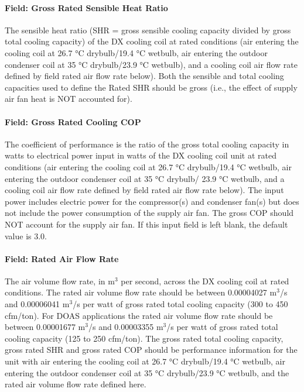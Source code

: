 \paragraph{Field: Gross Rated Sensible Heat Ratio}\label{field-gross-rated-sensible-heat-ratio}

The sensible heat ratio (SHR = gross sensible cooling capacity divided by gross total cooling capacity) of the DX cooling coil at rated conditions (air entering the cooling coil at 26.7 °C drybulb/19.4 °C wetbulb, air entering the outdoor condenser coil at 35 °C drybulb/23.9 °C wetbulb), and a cooling coil air flow rate defined by field rated air flow rate below). Both the sensible and total cooling capacities used to define the Rated SHR should be gross (i.e., the effect of supply air fan heat is NOT accounted for).

\paragraph{Field: Gross Rated Cooling COP}\label{field-gross-rated-cooling-cop}

The coefficient of performance is the ratio of the gross total cooling capacity in watts to electrical power input in watts of the DX cooling coil unit at rated conditions (air entering the cooling coil at 26.7 °C drybulb/19.4 °C wetbulb, air entering the outdoor condenser coil at 35 °C drybulb/ 23.9 °C wetbulb, and a cooling coil air flow rate defined by field rated air flow rate below). The input power includes electric power for the compressor(s) and condenser fan(s) but does not include the power consumption of the supply air fan. The gross COP should NOT account for the supply air fan. If this input field is left blank, the default value is 3.0.

\paragraph{Field: Rated Air Flow Rate}\label{field-rated-air-flow-rate-2}

The air volume flow rate, in m\(^{3}\) per second, across the DX cooling coil at rated conditions. The rated air volume flow rate should be between 0.00004027 m\(^{3}\)/s and 0.00006041 m\(^{3}\)/s per watt of gross rated total cooling capacity (300 to 450 cfm/ton). For DOAS applications the rated air volume flow rate should be between 0.00001677 m\(^{3}\)/s and 0.00003355 m\(^{3}\)/s per watt of gross rated total cooling capacity (125 to 250 cfm/ton). The gross rated total cooling capacity, gross rated SHR and gross rated COP should be performance information for the unit with air entering the cooling coil at 26.7 °C drybulb/19.4 °C wetbulb, air entering the outdoor condenser coil at 35 °C drybulb/23.9 °C wetbulb, and the rated air volume flow rate defined here.

